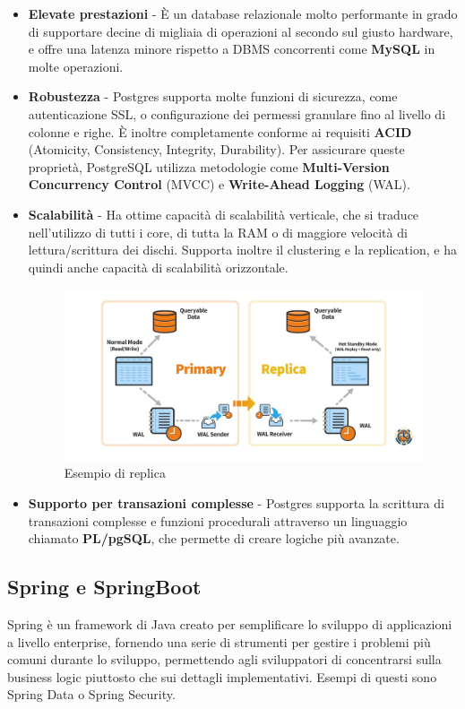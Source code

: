 \begin{itemize}
  \item \textbf{Elevate prestazioni} - \`E un database relazionale molto performante in grado di supportare decine di migliaia di operazioni al secondo sul giusto hardware,
    e offre una latenza minore rispetto a DBMS concorrenti come \textbf{MySQL} in molte operazioni.\cite{salunke2024performance}
  \item \textbf{Robustezza} - Postgres supporta molte funzioni di sicurezza, come autenticazione SSL, o configurazione dei permessi granulare fino al
    livello di colonne e righe.
    \`E inoltre completamente conforme ai requisiti \textbf{ACID} (Atomicity, Consistency, Integrity, Durability).
    Per assicurare queste propriet\`a, PostgreSQL utilizza metodologie come \textbf{Multi-Version Concurrency Control} (MVCC) e \textbf{Write-Ahead Logging} (WAL).
  \item \textbf{Scalabilit\`a} - Ha ottime capacit\`a di scalabilit\`a verticale, che si traduce nell'utilizzo di tutti i core,
    di tutta la RAM o di maggiore velocit\`a di lettura/scrittura dei dischi.
    Supporta inoltre il clustering e la replication, e ha quindi anche capacit\`a di scalabilit\`a orizzontale.
    \begin{figure}[H]
      \centering
      \includegraphics[width=15cm]{images/postgres-replication.png}
      \caption{Esempio di replica\cite{postgreshighavail}}
    \end{figure}
  \item \textbf{Supporto per transazioni complesse} - Postgres supporta la scrittura di transazioni complesse e funzioni procedurali attraverso un linguaggio chiamato
    \textbf{PL/pgSQL}, che permette di creare logiche pi\`u avanzate.
\end{itemize}
\subsection {Spring e SpringBoot}
Spring \`e un framework di Java creato per semplificare lo sviluppo di applicazioni a livello enterprise, fornendo una serie di strumenti per gestire i problemi pi\`u comuni
durante lo sviluppo, permettendo agli sviluppatori di concentrarsi sulla business logic piuttosto che sui dettagli implementativi.
Esempi di questi sono Spring Data o Spring Security.

